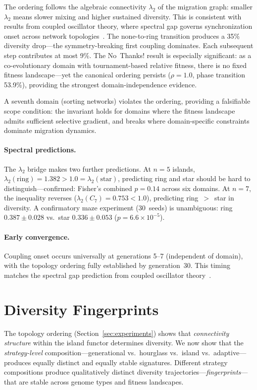 \documentclass[dvipsnames,format=sigconf,anonymous=false,review=false]{acmart}
\begin{document}
The ordering follows the algebraic connectivity $\lambda_2$ of the migration graph: smaller $\lambda_2$ means slower mixing and higher sustained diversity. This is consistent with results from coupled oscillator theory, where spectral gap governs synchronization onset across network topologies~\cite{sanz2026algebraic}. The none-to-ring transition produces a 35\% diversity drop---the symmetry-breaking first coupling dominates. Each subsequent step contributes at most 9\%. The No~Thanks! result is especially significant: as a co-evolutionary domain with tournament-based relative fitness, there is no fixed fitness landscape---yet the canonical ordering persists ($\rho = 1.0$, phase transition 53.9\%), providing the strongest domain-independence evidence.

A seventh domain (sorting networks) violates the ordering, providing a falsifiable scope condition: the invariant holds for domains where the fitness landscape admits sufficient selective gradient, and breaks where domain-specific constraints dominate migration dynamics.

\paragraph{Spectral predictions.}
The $\lambda_2$ bridge makes two further predictions. At $n{=}5$ islands, $\lambda_2(\text{ring}) = 1.382 > 1.0 = \lambda_2(\text{star})$, predicting ring and star should be hard to distinguish---confirmed: Fisher's combined $p = 0.14$ across six domains. At $n{=}7$, the inequality reverses ($\lambda_2(C_7) = 0.753 < 1.0$), predicting ring~$>$~star in diversity. A confirmatory maze experiment (30~seeds) is unambiguous: ring $0.387 \pm 0.028$ vs.\ star $0.336 \pm 0.053$ ($p = 6.6 \times 10^{-5}$).

\paragraph{Early convergence.}
Coupling onset occurs universally at generations 5--7 (independent of domain), with the topology ordering fully established by generation~30. This timing matches the spectral gap prediction from coupled oscillator theory~\cite{sanz2026algebraic}.

\section{Diversity Fingerprints}
\label{sec:fingerprints}

The topology ordering (Section~\ref{sec:experiments}) shows that \emph{connectivity structure} within the island functor determines diversity. We now show that the \emph{strategy-level} composition---generational vs.\ hourglass vs.\ island vs.\ adaptive---produces equally distinct and equally stable signatures. Different strategy compositions produce qualitatively distinct diversity trajectories---\emph{fingerprints}---that are stable across genome types and fitness landscapes.
\end{document}

